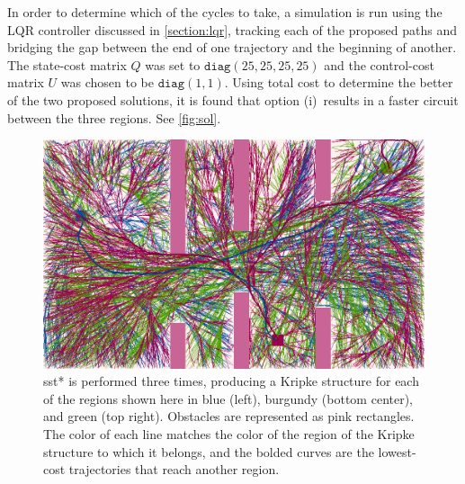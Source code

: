 In order to determine which of the cycles to take, a simulation is run using the LQR controller discussed in \autoref{section:lqr}, tracking each of the proposed paths and bridging the gap between the end of one trajectory and the beginning of another. The state-cost matrix $Q$ was set to $\texttt{diag}(25, 25, 25, 25)$ and the control-cost matrix $U$ was chosen to be $\texttt{diag}(1, 1)$. Using total cost to determine the better of the two proposed solutions, it is found that option (i)\ results in a faster circuit between the three regions. See \autoref{fig:sol}.


\begin{figure}
    \centering
    \includegraphics[scale=0.61]{./figures/doubleint2.png}
    \caption[Double Integrator Example --- Three Trees using SST*]{\gls{sst}* is performed three times, producing a Kripke structure for each of the regions shown here in blue (left), burgundy (bottom center), and green (top right). Obstacles are represented as pink rectangles. The color of each line matches the color of the region of the Kripke structure to which it belongs, and the bolded curves are the lowest-cost trajectories that reach another region.} 
    \label{fig:all_trees}
\end{figure}

